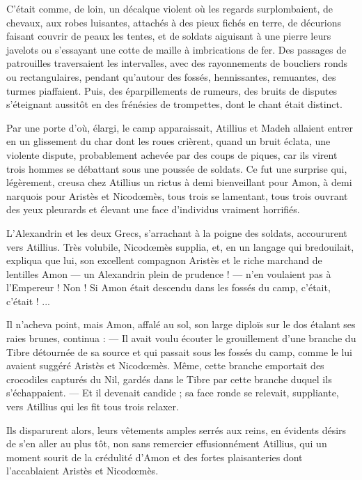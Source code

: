 \documentclass[a4paper, 11pt, oneside, polutonikogreek, french]{article}
\begin{document}
C'était comme, de loin, un décalque violent où les regards surplombaient, de chevaux, aux robes luisantes, attachés à des pieux fichés en terre, de décurions faisant couvrir de peaux les tentes, et de soldats aiguisant à une pierre leurs javelots ou s'essayant une cotte de maille à imbrications de fer. Des passages de patrouilles traversaient les intervalles, avec des rayonnements de boucliers ronds ou rectangulaires, pendant qu'autour des fossés, hennissantes, remuantes, des turmes piaffaient. Puis, des éparpillements de rumeurs, des bruits de disputes s'éteignant aussitôt en des frénésies de trompettes, dont le chant était distinct.

Par une porte d'où, élargi, le camp apparaissait, Atillius et Madeh allaient entrer en un glissement du char dont les roues crièrent, quand un bruit éclata, une violente dispute, probablement achevée par des coups de piques, car ils virent trois hommes se débattant sous une poussée de soldats. Ce fut une surprise qui, légèrement, creusa chez Atillius un rictus à demi bienveillant pour Amon, à demi narquois pour Aristès et Nicodœmès, tous trois se lamentant, tous trois ouvrant des yeux pleurards et élevant une face d'individus vraiment horrifiés.

L'Alexandrin et les deux Grecs, s'arrachant à la poigne des soldats, accoururent vers Atillius. Très volubile, Nicodœmès supplia, et, en un langage qui bredouilait, expliqua que lui, son excellent compagnon Aristès et le riche marchand de lentilles Amon --- un Alexandrin plein de prudence ! --- n'en voulaient pas à l'Empereur ! Non ! Si Amon était descendu dans les fossés du camp, c'était, c'était ! ...

Il n'acheva point, mais Amon, affalé au sol, son large diploïs sur le dos étalant ses raies brunes, continua : --- Il avait voulu écouter le grouillement d'une branche du Tibre détournée de sa source et qui passait sous les fossés du camp, comme le lui avaient suggéré Aristès et Nicodœmès. Même, cette branche emportait des crocodiles capturés du Nil, gardés dans le Tibre par cette branche duquel ils s'échappaient. --- Et il devenait candide ; sa face ronde se relevait, suppliante, vers Atillius qui les fit tous trois relaxer.

Ils disparurent alors, leurs vêtements amples serrés aux reins, en évidents désirs de s'en aller au plus tôt, non sans remercier effusionnément Atillius, qui un moment sourit de la crédulité d'Amon et des fortes plaisanteries dont l'accablaient Aristès et Nicodœmès.
\end{document}
